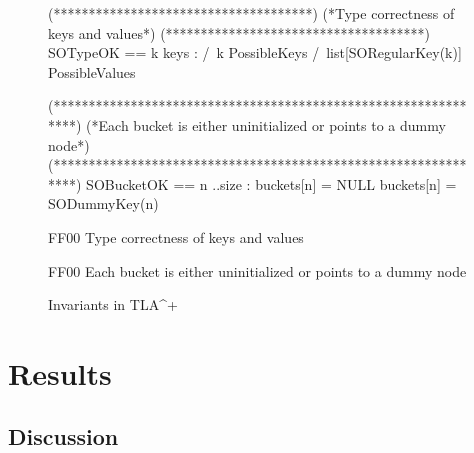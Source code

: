 \documentclass{uit-thesis}
\begin{document}
\begin{figure}
\begin{tla}
(*************************************)
(*Type correctness of keys and values*)
(*************************************)
SOTypeOK == \forall k \in keys :
                /\ k \in PossibleKeys
                /\ list[SORegularKey(k)] \in PossibleValues

(***************************************************************)
(*Each bucket is either uninitialized or points to a dummy node*)
(***************************************************************)
SOBucketOK == \forall n ..size :
                    \/ buckets[n] = NULL
                    \/ buckets[n] = SODummyKey(n)
\end{tla}
\begin{tlatex}
\begin{lcom}{0}%
\begin{cpar}{0}{F}{F}{0}{0}{}%
Type correctness of keys and values
\end{cpar}%
\end{lcom}%
%
%
%
\@pvspace{8.0pt}%
\begin{lcom}{0}%
\begin{cpar}{0}{F}{F}{0}{0}{}%
Each bucket is either uninitialized or points to a dummy node
\end{cpar}%
\end{lcom}%
%
%
%
\end{tlatex}
\caption{Invariants in TLA^+}
\label{fig:invariants}
\end{figure}


\chapter{Results}\label{ch:results}
\section{Discussion}\label{sec:discussion}

\backmatter
\printbibliography{}
\appendix
{}
\end{document}
